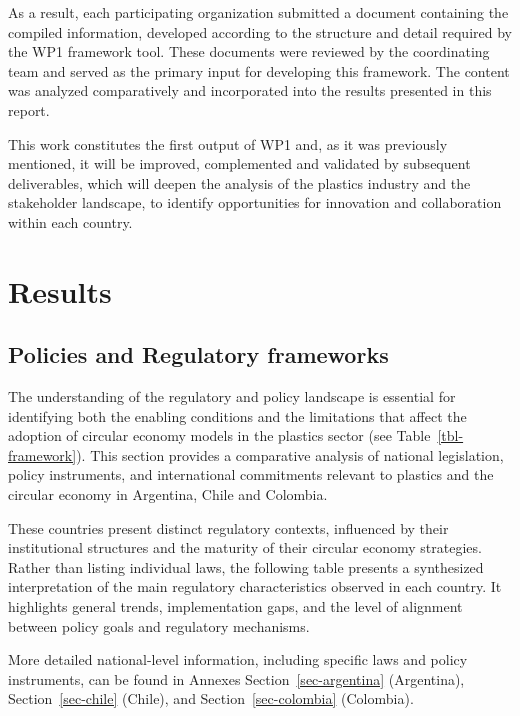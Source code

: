 \documentclass[
  12pt,
  oneside]{book}
\begin{document}
As a result, each participating organization submitted a document
containing the compiled information, developed according to the
structure and detail required by the WP1 framework tool. These documents
were reviewed by the coordinating team and served as the primary input
for developing this framework. The content was analyzed comparatively
and incorporated into the results presented in this report.

This work constitutes the first output of WP1 and, as it was previously
mentioned, it will be improved, complemented and validated by subsequent
deliverables, which will deepen the analysis of the plastics industry
and the stakeholder landscape, to identify opportunities for innovation
and collaboration within each country.

\chapter{Results}\label{results}

\section{Policies and Regulatory
frameworks}\label{policies-and-regulatory-frameworks}

The understanding of the regulatory and policy landscape is essential
for identifying both the enabling conditions and the limitations that
affect the adoption of circular economy models in the plastics sector
(see Table~\ref{tbl-framework}). This section provides a comparative
analysis of national legislation, policy instruments, and international
commitments relevant to plastics and the circular economy in Argentina,
Chile and Colombia.

These countries present distinct regulatory contexts, influenced by
their institutional structures and the maturity of their circular
economy strategies. Rather than listing individual laws, the following
table presents a synthesized interpretation of the main regulatory
characteristics observed in each country. It highlights general trends,
implementation gaps, and the level of alignment between policy goals and
regulatory mechanisms.

More detailed national-level information, including specific laws and
policy instruments, can be found in Annexes Section~\ref{sec-argentina}
(Argentina), Section~\ref{sec-chile} (Chile), and
Section~\ref{sec-colombia} (Colombia).
\end{document}
